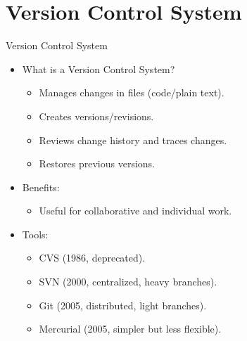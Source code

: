 \section{Version Control System}
\begin{frame}{Version Control System}
  \begin{itemize}
    \item What is a Version Control System?
    \begin{itemize}
      \item Manages changes in files (code/plain text).
      \item Creates versions/revisions.
      \item Reviews change history and traces changes.
      \item Restores previous versions.
    \end{itemize}
    \item Benefits:
    \begin{itemize}
      \item Useful for collaborative and individual work.
    \end{itemize}
    \item Tools:
    \begin{itemize}
      \item CVS (1986, deprecated).
      \item SVN (2000, centralized, heavy branches).
      \item Git (2005, distributed, light branches).
      \item Mercurial (2005, simpler but less flexible).
    \end{itemize}
  \end{itemize}
\end{frame}

